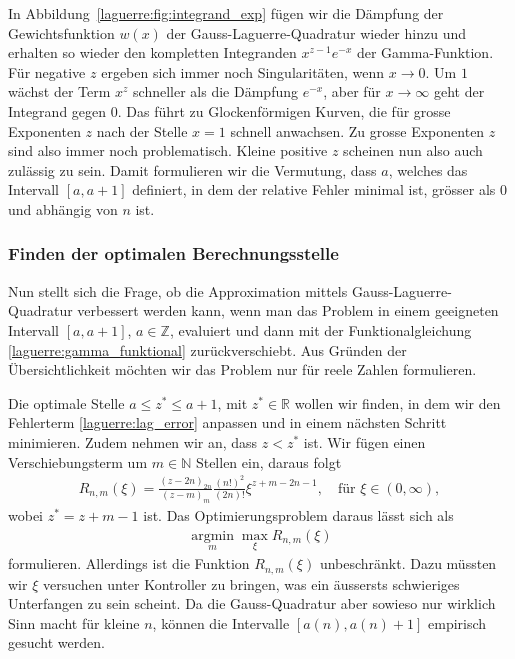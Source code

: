 In Abbildung~\ref{laguerre:fig:integrand_exp} fügen wir
die Dämpfung der Gewichtsfunktion $w(x)$
der Gauss-Laguerre-Quadratur wieder hinzu
und erhalten so wieder den kompletten Integranden $x^{z-1} e^{-x}$
der Gamma-Funktion.
Für negative $z$ ergeben sich immer noch Singularitäten,
wenn $x \rightarrow 0$.
Um $1$ wächst der Term $x^z$ schneller als die Dämpfung $e^{-x}$,
aber für $x \rightarrow \infty$ geht der Integrand gegen $0$.
Das führt zu Glockenförmigen Kurven,
die für grosse Exponenten $z$ nach der Stelle $x=1$ schnell anwachsen.
Zu grosse Exponenten $z$ sind also immer noch problematisch.
Kleine positive $z$ scheinen nun also auch zulässig zu sein.
Damit formulieren wir die Vermutung,
dass $a$,
welches das Intervall $[a,a+1]$ definiert,
in dem der relative Fehler minimal ist,
grösser als $0$ und abhängig von $n$ ist.

\subsubsection{Finden der optimalen Berechnungsstelle}
Nun stellt sich die Frage,
ob die Approximation mittels Gauss-Laguerre-Quadratur verbessert werden kann,
wenn man das Problem in einem geeigneten Intervall $[a, a+1]$, 
$a \in \mathbb{Z}$, 
evaluiert und dann mit der 
Funktionalgleichung \eqref{laguerre:gamma_funktional} zurückverschiebt.
Aus Gründen der Übersichtlichkeit möchten wir das Problem nur für reele Zahlen
formulieren.

Die optimale Stelle $a \leq z^* \leq a+1$,
mit $z^* \in \mathbb{R}$ wollen wir finden,
in dem wir den Fehlerterm \eqref{laguerre:lag_error} anpassen
und in einem nächsten Schritt minimieren.
Zudem nehmen wir an,
dass $z < z^*$ ist.
Wir fügen einen Verschiebungsterm um $m \in \mathbb{N}$ Stellen ein, 
daraus folgt
\begin{align*}
R_{n,m}(\xi)
=
\frac{(z - 2n)_{2n}}{(z - m)_m} \frac{(n!)^2}{(2n)!} \xi^{z + m - 2n - 1}
,\quad
\text{für }
\xi \in (0, \infty)
,
\end{align*}
wobei $z^* = z + m - 1$ ist.
Das Optimierungsproblem daraus lässt sich als
\begin{align*}
\operatorname*{argmin}_m \max_\xi R_{n,m}(\xi)
\end{align*}
formulieren.
Allerdings ist die Funktion $R_{n,m}(\xi)$ unbeschränkt.
Dazu müssten wir $\xi$ versuchen unter Kontroller zu bringen,
was ein äussersts schwieriges Unterfangen zu sein scheint.
Da die Gauss-Quadratur aber sowieso nur wirklich Sinn macht für kleine $n$,
können die Intervalle $[a(n), a(n)+1]$ empirisch gesucht werden.


